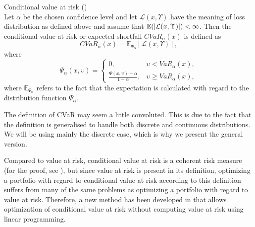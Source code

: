 
\begin{defn}{\normalfont Conditional value at risk} 
\label{cvar_definition}
{\normalfont (\cite[Definition 3]{cvar_general_loss_distributions})}
\\
Let $\alpha$ be the chosen confidence level and let $\mathcal{L}(x,\Upsilon)$ have the meaning of loss distribution as defined above and assume that $\mathbb{E}(\left|{\mathcal{L}(x,\Upsilon)}\right|)<\infty$. Then the conditional value at risk or expected shortfall $CVaR_{\alpha}(x)$ is defined as
\begin{equation}
CVaR_{\alpha}(x)=\mathbb{E}_{\Psi_{\alpha}}\left[\mathcal{L}(x,\Upsilon)\right],
\end{equation}
where 
\begin{equation*}
\Psi_{\alpha}(x,\upsilon) = 
		\begin{cases} 
		0, & \upsilon < VaR_{\alpha}(x), \\
		\frac{\Psi(x,\upsilon)-\alpha}{1-\alpha}, & \upsilon \geq VaR_{\alpha}(x),
		\end{cases}
\end{equation*}
where $\mathbb{E}_{\Psi_{\alpha}}$ refers to the fact that the expectation is calculated with regard to the distribution function $\Psi_{\alpha}$.
\end{defn}
The definition of CVaR may seem a little convoluted. This is due to the fact that the definition is generalised to handle both discrete and continuous distributions. We will be using mainly the discrete case, which is why we present the general version.
  
Compared to value at risk, conditional value at risk is a coherent risk measure (for the proof, see \cite[Example 2.26.]{mcneil2015quantitative}), but since value at risk is present in its definition, optimizing a portfolio with regard to conditional value at risk according to this definition suffers from many of the same problems as optimizing a portfolio with regard to value at risk. Therefore, a new method has been developed in \cite{Rockafellar2000OptimizationOC} that allows optimization of conditional value at risk without computing value at risk using linear programming.
\newpage
